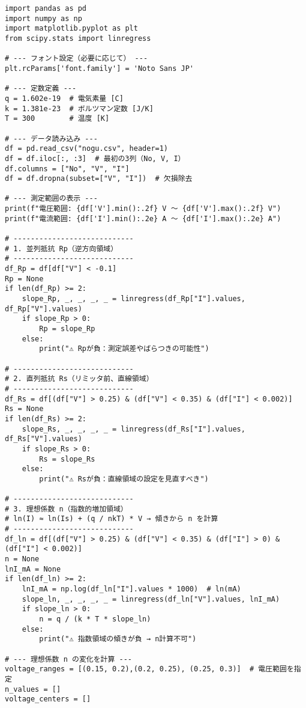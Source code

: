 \begin{lstlisting}
import pandas as pd
import numpy as np
import matplotlib.pyplot as plt
from scipy.stats import linregress

# --- フォント設定（必要に応じて） ---
plt.rcParams['font.family'] = 'Noto Sans JP'

# --- 定数定義 ---
q = 1.602e-19  # 電気素量 [C]
k = 1.381e-23  # ボルツマン定数 [J/K]
T = 300        # 温度 [K]

# --- データ読み込み ---
df = pd.read_csv("nogu.csv", header=1)
df = df.iloc[:, :3]  # 最初の3列（No, V, I）
df.columns = ["No", "V", "I"]
df = df.dropna(subset=["V", "I"])  # 欠損除去

# --- 測定範囲の表示 ---
print(f"電圧範囲: {df['V'].min():.2f} V ～ {df['V'].max():.2f} V")
print(f"電流範囲: {df['I'].min():.2e} A ～ {df['I'].max():.2e} A")

# ----------------------------
# 1. 並列抵抗 Rp（逆方向領域）
# ----------------------------
df_Rp = df[df["V"] < -0.1]
Rp = None
if len(df_Rp) >= 2:
    slope_Rp, _, _, _, _ = linregress(df_Rp["I"].values, df_Rp["V"].values)
    if slope_Rp > 0:
        Rp = slope_Rp
    else:
        print("⚠ Rpが負：測定誤差やばらつきの可能性")

# ----------------------------
# 2. 直列抵抗 Rs（リミッタ前、直線領域）
# ----------------------------
df_Rs = df[(df["V"] > 0.25) & (df["V"] < 0.35) & (df["I"] < 0.002)]
Rs = None
if len(df_Rs) >= 2:
    slope_Rs, _, _, _, _ = linregress(df_Rs["I"].values, df_Rs["V"].values)
    if slope_Rs > 0:
        Rs = slope_Rs
    else:
        print("⚠ Rsが負：直線領域の設定を見直すべき")

# ----------------------------
# 3. 理想係数 n（指数的増加領域）
# ln(I) ≈ ln(Is) + (q / nkT) * V → 傾きから n を計算
# ----------------------------
df_ln = df[(df["V"] > 0.25) & (df["V"] < 0.35) & (df["I"] > 0) & (df["I"] < 0.002)]
n = None
lnI_mA = None
if len(df_ln) >= 2:
    lnI_mA = np.log(df_ln["I"].values * 1000)  # ln(mA)
    slope_ln, _, _, _, _ = linregress(df_ln["V"].values, lnI_mA)
    if slope_ln > 0:
        n = q / (k * T * slope_ln)
    else:
        print("⚠ 指数領域の傾きが負 → n計算不可")

# --- 理想係数 n の変化を計算 ---
voltage_ranges = [(0.15, 0.2),(0.2, 0.25), (0.25, 0.3)]  # 電圧範囲を指定
n_values = []
voltage_centers = []


\end{lstlisting}

